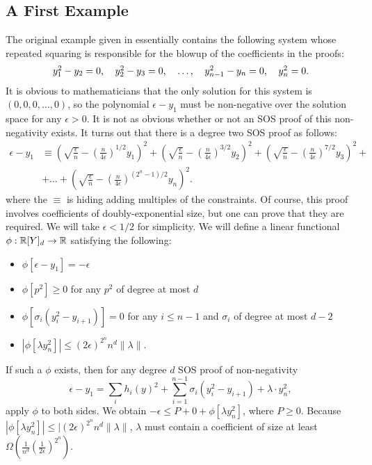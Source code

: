 \subsection{A First Example}
The original example given in \cite{odonnel} essentially contains the following system whose repeated squaring is responsible for the blowup of the coefficients in the proofs:
\[\begin{tabular}{ccccc}
$y_1^2 - y_2 = 0$, & $y_2^2 - y_3 = 0$, & $\dots$, & $y_{n-1}^2 - y_n = 0$, & $y_n^2 = 0$.
\end{tabular}\]
It is obvious to mathematicians that the only solution for this system is $(0,0,0,\dots,0)$, so the polynomial $\epsilon - y_1$ must be non-negative over the solution space for any $\epsilon > 0$. It is not as obvious whether or not an SOS proof of this non-negativity exists. It turns out that there is a degree two SOS proof as follows:
\begin{align*}\label{eq:proof}
\epsilon - y_1 &\equiv \left(\sqrt{\frac{\epsilon}{n}} - \left(\frac{n}{4\epsilon}\right)^{1/2}y_1\right)^2 + \left(\sqrt{\frac{\epsilon}{n}} - \left(\frac{n}{4\epsilon}\right)^{3/2}y_2\right)^2 + \left(\sqrt{\frac{\epsilon}{n}} - \left(\frac{n}{4\epsilon}\right)^{7/2}y_3\right)^2 + \\
&+\dots + \left(\sqrt{\frac{\epsilon}{n}} - \left(\frac{n}{4\epsilon}\right)^{(2^n-1)/2}y_n\right)^2.
\end{align*}
where the $\equiv$ is hiding adding multiples of the constraints. Of course, this proof involves coefficients of doubly-exponential size, but one can prove that they are required. We will take $\epsilon < 1/2$ for simplicity. We will define a linear functional $\phi: \mathbb R[Y]_d \rightarrow \mathbb R$ satisfying the following:
\begin{itemize}
\item $\phi[\epsilon - y_1] = -\epsilon$
\item $\phi[p^2] \geq 0$ for any $p^2$ of degree at most $d$
\item $\phi[\sigma_i(y_i^2 - y_{i+1})] = 0$ for any $i \leq n-1$ and $\sigma_i$ of degree at most $d-2$
\item $|\phi[\lambda y_n^2]| \leq (2\epsilon)^{2^n}n^d\|\lambda\|$.
\end{itemize}
If such a $\phi$ exists, then for any degree $d$ SOS proof of non-negativity
\[\epsilon - y_1 = \sum_i h_i(y)^2 + \sum_{i=1}^{n-1} \sigma_i(y_i^2 - y_{i+1}) + \lambda \cdot y_n^2,\]
apply $\phi$ to both sides. We obtain $-\epsilon \leq P + 0 + \phi[\lambda y_n^2]$, where $P \geq 0$. Because $|\phi[\lambda y_n^2]| \leq |(2\epsilon)^{2^n}n^d\|\lambda\|$, $\lambda$ must contain a coefficient of size at least $\Omega(\frac{1}{n^d}\left(\frac{1}{2\epsilon}\right)^{2^n})$.

